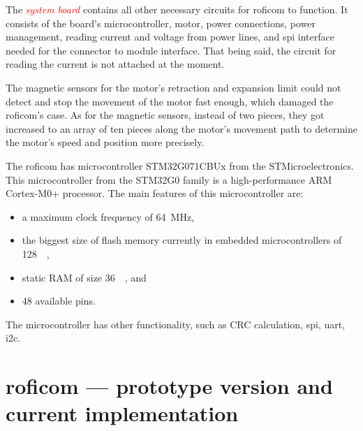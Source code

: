 \documentclass[
  digital,     %
  oneside,     %
  nosansbold,  %
  nocolorbold, %
  nolof,         %
  nolot,         %
]{fithesis4}
\newcommand{\TODO}[1]{\textcolor{red}{\textit{#1}}}
\newcommand{\TODOLIST}[1]{}
\begin{document}
{{{The \TODO{system board} contains all other necessary circuits for \acrshort{roficom} to function. It consists of the board's microcontroller, motor, power connections, power management, reading current and voltage from power lines, and \acrshort{spi} interface needed for the connector to module interface. That being said, the circuit for reading the current is not attached at the moment.


The magnetic sensors for the motor's retraction and expansion limit could not detect and stop the movement of the motor fast enough, which damaged the \acrshort{roficom}'s case.
As for the magnetic sensors, instead of two pieces, they got increased to an array of ten pieces along the motor's movement path to determine the motor's speed and position more precisely.

The \acrshort{roficom} has microcontroller STM32G071CBUx from the STMicroelectronics. This microcontroller from the STM32G0 family is a high-performance ARM Cortex-M0+ processor. The main features of this microcontroller are:

\begin{itemize}
    \item a maximum clock frequency of \qty{64}{\mega\hertz},
    \item the biggest size of flash memory currently in embedded microcontrollers of \qty{128}{\kilo\byte},
    \item static RAM of size \qty{36}{\kilo\byte}, and
    \item 48 available pins.
\end{itemize}

The microcontroller has other functionality, such as CRC calculation, \acrshort{spi}, \acrshort{uart}, \acrshort{i2c}.


\chapter[ RoFICoM --- prototype version and current implementation ]{ \acrshort{roficom} --- prototype version and current implementation }
\TODOLIST{
\begin{itemize}
    \item Project structure/architecture
    \begin{itemize}
        \item suites
        \item Protocol
    \end{itemize}
    \item \texttt{control\_board}
    \item \texttt{stm32cxx}
    \item \texttt{rofi-hal}
\end{itemize}
}

}}}
\end{document}
